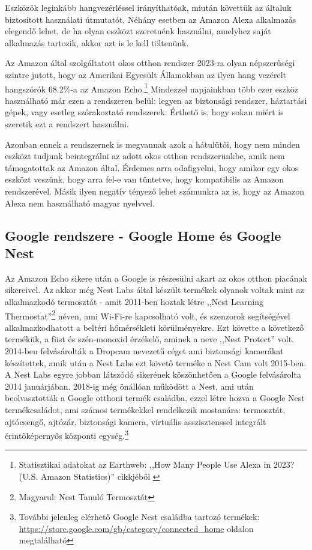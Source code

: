 \documentclass[
]{thesis-ekf}
\theoremstyle{definition}
\theoremstyle{remark}
\begin{document}
	Eszközök leginkább hangvezérléssel irányíthatóak, miután követtük az általuk biztosított használati útmutatót. Néhány esetben az Amazon Alexa alkalmazás elegendő lehet, de ha olyan eszközt szeretnénk használni, amelyhez saját alkalmazás tartozik, akkor azt is le kell töltenünk.
	
	Az Amazon által szolgáltatott okos otthon rendszer 2023-ra olyan népszerűségi szintre jutott, hogy az Amerikai Egyesült Államokban az ilyen hang vezérelt hangszórók 68.2\%-a az Amazon Echo.\footnote{Statisztikai adatokat az Earthweb: ,,How Many People Use Alexa in 2023? (U.S. Amazon Statistics)'' cikkjéből \cite{amazon-stats}} Mindezzel napjainkban több ezer eszköz használható már ezen a rendszeren belül: legyen az biztonsági rendszer, háztartási gépek, vagy esetleg szórakoztató rendszerek. Érthető is, hogy sokan miért is szeretik ezt a rendszert használni.
	
	Azonban ennek a rendszernek is megvannak azok a hátulütői, hogy nem minden eszközt tudjunk beintegrálni az adott okos otthon rendszerünkbe, amik nem támogatottak az Amazon által. Érdemes arra odafigyelni, hogy amikor egy okos eszközt veszünk, hogy arra fel-e van tüntetve, hogy kompatibilis az Amazon rendszerével. Másik ilyen negatív tényező lehet számunkra az is, hogy az Amazon Alexa nem használható magyar nyelvvel.
	
	\subsection{Google rendszere - Google Home és Google Nest}
	Az Amazon Echo sikere után a Google is részesülni akart az okos otthon piacának sikereivel. Az akkor még Nest Labs által készült termékek olyanok voltak mint az alkalmazkodó termosztát - amit 2011-ben hoztak létre ,,Nest Learning Thermostat''\footnote{Magyarul: Nest Tanuló Termosztát} néven, ami Wi-Fi-re kapcsolható volt, és szenzorok segítségével alkalmazkodhatott a beltéri hőmérsékleti körülményekre. Ezt követte a következő termékük, a füst és szén-monoxid érzékelő, aminek a neve ,,Nest Protect'' volt. 2014-ben felvásárolták a Dropcam nevezetű céget ami biztonsági kamerákat készítettek, amik után a Nest Labs ezt követő terméke a Nest Cam volt 2015-ben. A Nest Labs egyre jobban látszódó sikerének köszönhetően a Google felvásárolta 2014 januárjában. 2018-ig még önállóan működött a Nest, ami után beolvasztották a Google otthoni termék családba, ezzel létre hozva a Google Nest termékcsaládot, ami számos termékekkel rendelkezik mostanára: termosztát, ajtócsengő, ajtózár, biztonsági kamera, virtuális asszisztenssel integrált érintőképernyős központi egység.\footnote{\label{google-store} További jelenleg elérhető Google Nest családba tartozó termékek: \url{https://store.google.com/gb/category/connected_home} oldalon megtalálható}
	
\end{document}
